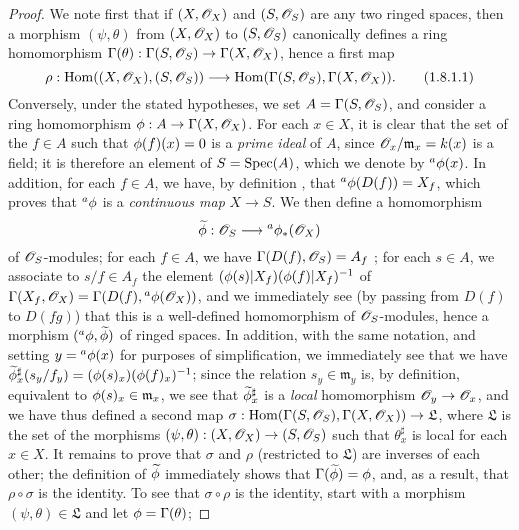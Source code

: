 \begin{proof}
\label{proof-1.1.8.1}
We note first that if $(X,\mathscr{O}_X)$ and $(S,\mathscr{O}_S)$ are any two ringed spaces, then a morphism $(\psi,\theta)$ from $(X,\mathscr{O}_X)$ to $(S,\mathscr{O}_S)$ canonically defines a ring homomorphism $\Gamma(\theta):\Gamma(S,\sh{O}_S)\to\Gamma(X,\sh{O}_X)$, hence a first map
\[
  \label{1.1.8.1.1}
  \rho:\Hom((X,\sh{O}_X),(S,\sh{O}_S))\to\Hom(\Gamma(S,\sh{O}_S),\Gamma(X,\sh{O}_X)).
  \tag{1.8.1.1}
\]
Conversely, under the stated hypotheses, we set $A=\Gamma(S,\mathscr{O}_S)$, and consider a ring homomorphism $\vphi:A\to\Gamma(X,\sh{O}_X)$.
For each $x\in X$, it is clear that the set of the $f\in A$ such that $\phi(f)(x)=0$ is a \emph{prime ideal} of $A$, since $\mathscr{O}_x/\mathfrak{m}_x=k(x)$ is a field;
it is therefore an element of $S=\operatorname{Spec}(A)$, which we denote by ${}^a\phi(x)$.
In addition, for each $f\in A$, we have, by definition , that ${}^a\phi(D(f))=X_f$, which proves that ${}^a\phi$ is a \emph{continuous map} $X\to S$.
We then define a homomorphism
\[
  \widetilde{\vphi}:\sh{O}_S\to{}^a\vphi_*(\sh{O}_X)
\]
of $\mathscr{O}_S$-modules;
for each $f\in A$, we have $\Gamma(D(f),\mathscr{O}_S)=A_f$ ;
for each $s\in A$, we associate to $s/f\in A_f$ the element $(\phi(s)|X_f)(\phi(f)|X_f)^{-1}$ of $\Gamma(X_f,\mathscr{O}_X)=\Gamma(D(f),{}^a\phi(\mathscr{O}_X))$, and we immediately see (by passing from $D(f)$ to $D(fg)$) that this is a well-defined homomorphism of $\mathscr{O}_S$-modules, hence a morphism $({}^a\phi,\widetilde{\phi})$ of ringed spaces.
In addition, with the same notation, and setting $y={}^a\phi(x)$ for purposes of simplification, we immediately see  that we have $\widetilde{\phi}_x^\sharp(s_y/f_y)=(\phi(s)_x)(\phi(f)_x)^{-1}$;
since the relation $s_y\in\mathfrak{m}_y$ is, by definition, equivalent to $\phi(s)_x\in\mathfrak{m}_x$, we see that $\widetilde{\phi}_x^\sharp$ is a \emph{local} homomorphism $\sh{O}_y\to\sh{O}_x$, and we have thus defined a second map $\sigma:\Hom(\Gamma(S,\sh{O}_S),\Gamma(X,\sh{O}_X))\to\mathfrak{L}$, where $\mathfrak{L}$ is the set of the morphisms $(\psi,\theta):(X,\sh{O}_X)\to(S,\sh{O}_S)$ such that $\theta_x^\sharp$ is local for each $x\in X$.
It remains to prove that $\sigma$ and $\rho$ (restricted to $\mathfrak{L}$) are inverses of each other;
the definition of $\widetilde{\phi}$ immediately shows that $\Gamma(\widetilde{\phi})=\phi$, and, as a result, that $\rho\circ\sigma$ is the identity.
To see that $\sigma\circ\rho$ is the identity, start with a morphism $(\psi,\theta)\in\mathfrak{L}$ and let $\phi=\Gamma(\theta)$;

\end{proof}
